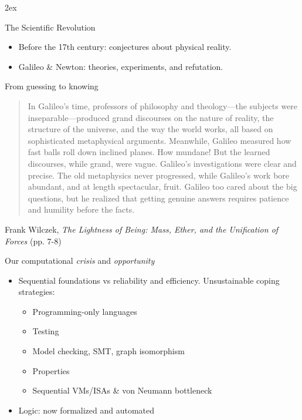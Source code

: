 \documentclass[aspectratio=169,handout]{beamer}
\begin{document}
\parskip2ex

\begin{center}
\maketitle
{}
\end{center}

\begin{frame}{The Scientific Revolution}
\begin{itemize}\itemsep5ex
\item Before the 17th century: conjectures about physical reality.
\item Galileo \& Newton: theories, experiments, and refutation.
\end{itemize}
\end{frame}

\begin{frame}{From guessing to knowing}
\vspace{8ex}
\begin{quotation}
In Galileo's time, professors of philosophy and theology---the subjects were inseparable---produced grand discourses on the nature of reality, the structure of the universe, and the way the world works, all based on sophisticated metaphysical arguments. Meanwhile, Galileo measured how fast balls roll down inclined planes. How mundane! But the learned discourses, while grand, were vague. Galileo's investigations were clear and precise. The old metaphysics never progressed, while Galileo's work bore abundant, and at length spectacular, fruit. Galileo too cared about the big questions, but he realized that getting genuine answers requires patience and humility before the facts.
\end{quotation}
Frank Wilczek, \emph{The Lightness of Being: Mass, Ether, and the Unification of Forces} (pp. 7-8)
\end{frame}

\begin{frame}{Our computational \emph{crisis} and \emph{opportunity}}
\begin{itemize}\itemsep2ex \parskip2ex
\item Sequential foundations vs reliability and efficiency.
Unsustainable coping strategies:
 \begin{itemize}\itemsep2ex
 \item Programming-only languages
 \item Testing
 \item Model checking, SMT, graph isomorphism
 \item Properties
 \item Sequential VMs/ISAs \& von Neumann bottleneck
 \end{itemize}
\item Logic: now formalized and automated
\end{itemize}
\end{frame}
\end{document}
